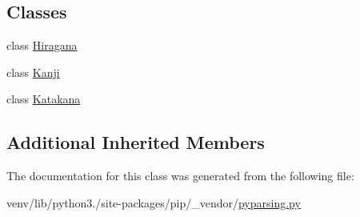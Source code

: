 \subsection*{Classes}
\begin{DoxyCompactItemize}
\item 
class \hyperlink{classpip_1_1__vendor_1_1pyparsing_1_1pyparsing__unicode_1_1Japanese_1_1Hiragana}{Hiragana}
\item 
class \hyperlink{classpip_1_1__vendor_1_1pyparsing_1_1pyparsing__unicode_1_1Japanese_1_1Kanji}{Kanji}
\item 
class \hyperlink{classpip_1_1__vendor_1_1pyparsing_1_1pyparsing__unicode_1_1Japanese_1_1Katakana}{Katakana}
\end{DoxyCompactItemize}
\subsection*{Additional Inherited Members}


The documentation for this class was generated from the following file\+:\begin{DoxyCompactItemize}
\item 
venv/lib/python3./site-\/packages/pip/\+\_\+vendor/\hyperlink{pip_2__vendor_2pyparsing_8py}{pyparsing.\+py}\end{DoxyCompactItemize}
